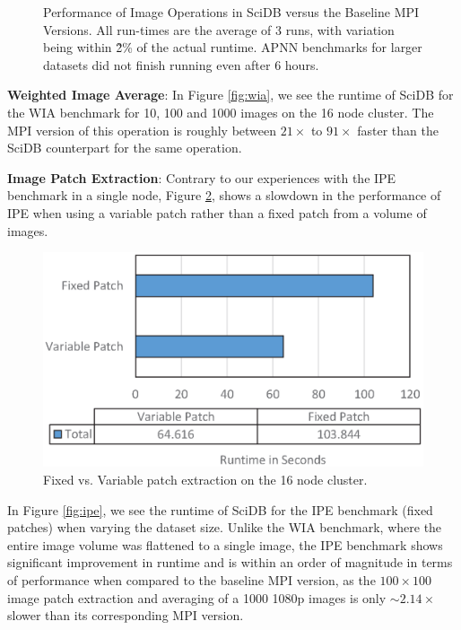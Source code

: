 \documentclass[letterpaper,twocolumn,10pt]{article}
\begin{document}
\begin{figure}[htp]
	\caption{Performance of Image Operations in SciDB versus the Baseline MPI Versions. All run-times are the average of 3 runs, with variation being within \~2\% of the actual runtime. APNN benchmarks for larger datasets did not finish running even after 6 hours.}
	\label{fig:mpi_result}
\end{figure}

\textbf{Weighted Image Average}: In Figure \ref{fig:wia}, we see the runtime of SciDB for the WIA benchmark for 10, 100 and 1000 images on the 16 node cluster. The MPI version of this operation is roughly between $21\times$ to $91\times$ faster than the SciDB counterpart for the same operation.

\textbf{Image Patch Extraction}: Contrary to our experiences with the IPE benchmark in a single node, Figure \ref{fig:ipe0}, shows a slowdown in the performance of IPE when using a variable patch rather than a fixed patch from a volume of images.


\begin{figure}[h]
\centering
\includegraphics[width=.50\textwidth]{figures/patch_result_cluster.eps}
\caption{Fixed vs. Variable patch extraction on the 16 node cluster.}
\label{fig:ipe0}
\end{figure}


In Figure \ref{fig:ipe}, we see the runtime of SciDB for the IPE benchmark (fixed patches) when varying the dataset size. Unlike the WIA benchmark, where the entire image volume was flattened to a single image, the IPE benchmark shows significant improvement in runtime and is within an order of magnitude in terms of performance when compared to the baseline MPI version, as the $100\times100$ image patch extraction and averaging of a 1000 1080p images is only $\sim 2.14\times$ slower than its corresponding MPI version.
\end{document}

